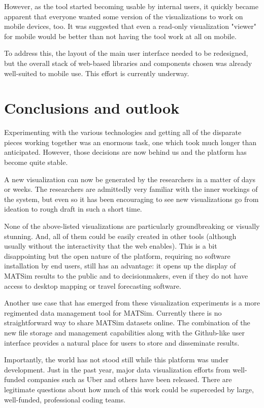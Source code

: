 \documentclass[Afour,sagev,times]{sagej}
\begin{document}
However, as the tool started becoming usable by internal users, it quickly became apparent that everyone wanted some version of the visualizations to work on mobile devices, too. It was suggested that even a read-only visualization "viewer" for mobile would be better than not having the tool work at all on mobile.

To address this, the layout of the main user interface needed to be redesigned, but the overall stack of web-based libraries and components chosen was already well-suited to mobile use. This effort is currently underway.

\section{Conclusions and outlook}

Experimenting with the various technologies and getting all of the disparate pieces working together was an enormous task, one which took much longer than anticipated. However, those decisions are now behind us and the platform has become quite stable.

A new visualization can now be generated by the researchers in a matter of days or weeks. The researchers are admittedly very familiar with the inner workings of the system, but even so it has been encouraging to see new visualizations go from ideation to rough draft in such a short time.

None of the above-listed visualizations are particularly groundbreaking or visually stunning. And, all of them could be easily created in other tools (although usually without the interactivity that the web enables). This is a bit disappointing but the open nature of the platform, requiring no software installation by end users, still has an advantage: it opens up the display of MATSim results to the public and to decisionmakers, even if they do not have access to desktop mapping or travel forecasting software.

Another use case that has emerged from these visualization experiments is a more regimented data management tool for MATSim. Currently there is no straightforward way to share MATSim datasets online. The combination of the new file storage and management capabilities along with the Github-like user interface provides a natural place for users to store and disseminate results.

Importantly, the world has not stood still while this platform was under development. Just in the past year, major data visualization efforts from well-funded companies such as Uber and others have been released. There are legitimate questions about how much of this work could be superceded by large, well-funded, professional coding teams.
\end{document}
